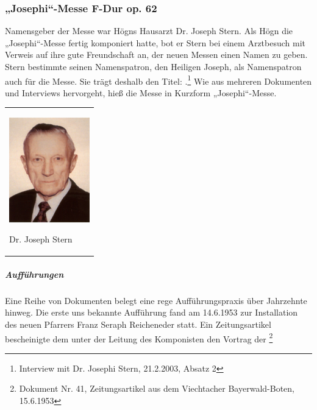 \subsubsection[„Josephi“{}-Messe F{}-Dur op. 62]{„Josephi“-Messe F-Dur
op. 62}


Namensgeber der Messe war Högns Hausarzt Dr. Joseph Stern. Als Högn die
„Josephi“-Messe fertig komponiert hatte, bot er Stern bei einem
Arztbesuch mit Verweis auf ihre gute Freundschaft an, der neuen Messen
einen Namen zu geben. Stern bestimmte seinen Namenspatron, den Heiligen
Joseph, als Namenspatron auch für die Messe. Sie trägt deshalb den
Titel: .\footnote{
Interview mit Dr. Josephi Stern, 21.2.2003, Absatz 2} Wie aus mehreren
Dokumenten und Interviews hervorgeht, hieß die Messe in Kurzform
„Josephi“-Messe.

\begin{center}
\begin{minipage}{3.884cm}
\begin{flushleft}
\tablefirsthead{}
\tablehead{}
\tabletail{}
\tablelasttail{}
\begin{supertabular}{m{3.684cm}}

\includegraphics[width=3.501cm,height=4.533cm]{pictures/zulassungsarbeit-img106.jpg}

Dr. Joseph Stern\\
\end{supertabular}
\end{flushleft}
\end{minipage}
\end{center}
\subparagraph{Aufführungen}
Eine Reihe von Dokumenten belegt eine rege Aufführungspraxis über
Jahrzehnte hinweg. Die erste uns bekannte Aufführung fand am 14.6.1953
zur Installation des neuen Pfarrers Franz Seraph Reicheneder statt. Ein
Zeitungsartikel bescheinigte dem 
unter der Leitung des Komponisten den 
Vortrag der  \footnote{Dokument
Nr. 41, Zeitungsartikel aus dem Viechtacher Bayerwald-Boten, 15.6.1953}

